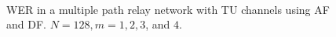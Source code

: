 \begin{figure}
{	 \\
}
\caption{WER in a multiple path relay network with TU channels using AF and DF.  $N = 128, m = 1, 2, 3$, and $4$.}
\label{fig:mp_af_df_wer_plots_TU}
\end{figure}

